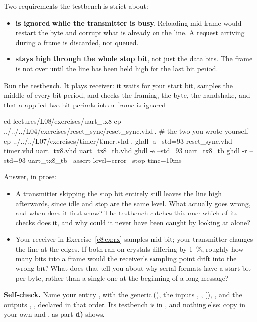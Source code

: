 Two requirements the testbench is strict about:
\begin{itemize}
  \item \textbf{ is ignored while the transmitter is busy.} Reloading mid-frame would
    restart the byte and corrupt what is already on the line. A request arriving during a frame is
    discarded, not queued.
  \item \textbf{ stays high through the whole stop bit}, not just the data bits. The frame
    is not over until the line has been held high for the last bit period.
\end{itemize}

 Run the testbench. It plays receiver: it waits for your start bit, samples the middle of
every bit period, and checks the framing, the byte, the  handshake, and that a 
applied two bit periods into a frame is ignored.

\begin{shell}
cd lectures/L08/exercises/uart_tx8
cp ../../../L04/exercises/reset_sync/reset_sync.vhd .     # the two you wrote yourself
cp ../../../L07/exercises/timer/timer.vhd .
ghdl -a --std=93 reset_sync.vhd timer.vhd uart_tx8.vhd uart_tx8_tb.vhd
ghdl -e --std=93 uart_tx8_tb
ghdl -r --std=93 uart_tx8_tb --assert-level=error --stop-time=10ms
\end{shell}

 Answer, in prose:
\begin{itemize}
  \item A transmitter skipping the stop bit entirely still leaves the line high afterwards, since
    idle and stop are the same level. What actually goes wrong, and when does it first show? The
    testbench catches this one: which of its checks does it, and why could it never have been caught
    by looking at  alone?
  \item Your receiver in Exercise~\ref{c8:ex:rx} samples mid-bit; your transmitter changes the line
    at the edges. If both ran on crystals differing by 1~\%, roughly how many bits into a frame would
    the receiver's sampling point drift into the wrong bit? What does that tell you about why serial
    formats have a start bit per byte, rather than a single one at the beginning of a long message?
\end{itemize}


\begin{selfcheck}
\textbf{Self-check.} Name your entity , with the generic 
(), the inputs , , 
(), , and the outputs , , declared
in that order. Its testbench is in , and nothing else: copy in your own
 and , as part \textbf{d)} shows.
\end{selfcheck}
